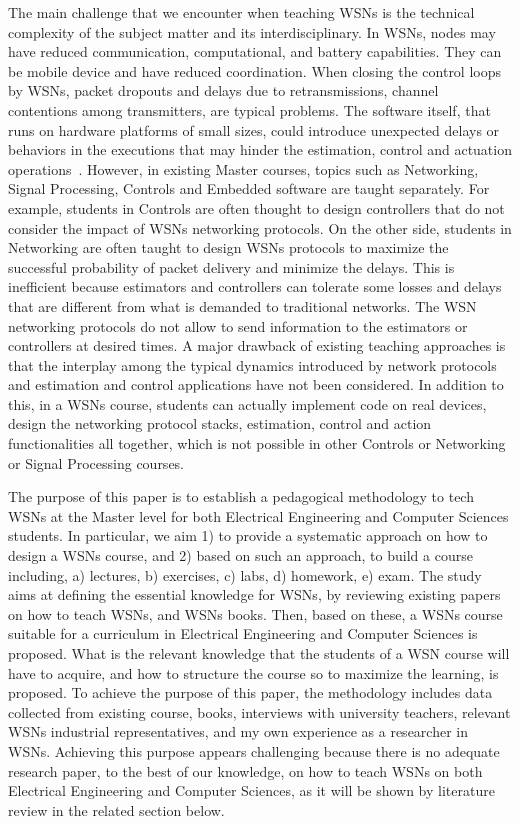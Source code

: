 \documentclass[onecolumn,12pt,draftclsnofoot,a4paper,peerreview]{IEEEtran}
\begin{document}
The main challenge that we encounter when teaching WSNs is the technical complexity of the subject matter and its interdisciplinary. In WSNs, nodes may have reduced communication, computational, and battery capabilities. They can be mobile device and have reduced coordination. 
When closing the control loops by WSNs, packet dropouts and delays due to retransmissions, channel contentions among transmitters, are typical problems. The software itself, that runs on hardware platforms of small sizes, could introduce unexpected delays or behaviors in the executions that may hinder the estimation, control and actuation operations~\cite{FischionePark+11}. However, in existing Master courses, topics such as Networking, Signal Processing, Controls and Embedded software are taught separately. For example, students in Controls are often thought to design controllers that do not consider the impact of WSNs networking protocols. On the other side, students in Networking are often taught to design WSNs protocols to maximize the successful probability of packet delivery and minimize the delays. This is inefficient because estimators and controllers can tolerate some losses and delays that are different from what is demanded to traditional networks. The WSN networking protocols do not allow to send information to the estimators or controllers at desired times. A major drawback of existing teaching approaches is that the interplay among the typical dynamics introduced by network protocols and estimation and control applications have not been considered. In addition to this, in a WSNs course, students can actually implement code on real devices, design the networking protocol stacks, estimation, control and action functionalities all together, which is not possible in other Controls or Networking or Signal Processing courses. 

The purpose of this paper is to establish a pedagogical methodology to tech WSNs at the Master level for both Electrical Engineering and Computer Sciences students.  
In particular, we aim 1) to provide a systematic approach on how to design a WSNs course, and 2) based on such an approach, to build a course including, a) lectures, b) exercises, c) labs, d) homework, e) exam. The study aims at defining the essential knowledge for WSNs, by reviewing existing papers on how to teach WSNs, and WSNs books. Then, based on these, a WSNs course suitable for a curriculum in Electrical Engineering and Computer Sciences is proposed. What is the relevant knowledge that the students of a WSN course will have to acquire, and how to structure the course so to maximize the learning, is proposed. To achieve the purpose of this paper, the methodology includes data collected from existing course, books, interviews with university teachers, relevant WSNs industrial representatives, and my own experience as a researcher in WSNs. Achieving this purpose appears challenging because there is no adequate research paper, to the best of our knowledge, on how to teach WSNs on both Electrical Engineering and Computer Sciences, as it will be shown by literature review in the related section below. 
\end{document}
